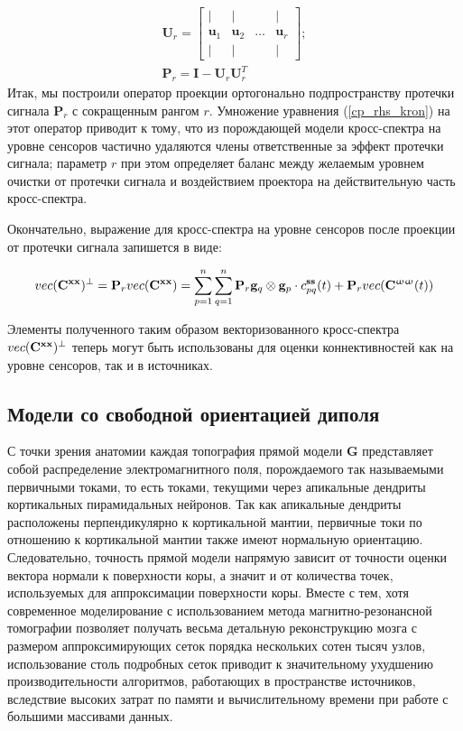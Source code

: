\begin{gather}
    \mathbf{U}_r =
    \begin{bmatrix}
        |            & |            &        & |       \\
        \mathbf{u}_1 & \mathbf{u}_2 & \dots  & \mathbf{u}_r \\
        |            & |            &        & |
    \end{bmatrix}\label{eq:U_fixed_or};\\
    \mathbf{P}_r = \mathbf{I} - \mathbf{U}_r \mathbf{U}_r^T\label{eq:P_fixed_or}
 \end{gather}
Итак, мы построили оператор проекции ортогонально подпространству протечки сигнала $\mathbf{P}_r$
с сокращенным рангом $r$.
Умножение уравнения (\ref{cp_rhs_kron}) на этот оператор приводит к тому, что  из порождающей
модели кросс-спектра на уровне сенсоров частично удаляются члены ответственные за эффект протечки сигнала;
параметр $r$ при этом определяет баланс между желаемым уровнем очистки от протечки сигнала и
воздействием проектора на действительную часть кросс-спектра.

Окончательно, выражение для кросс-спектра на уровне сенсоров после проекции от протечки сигнала
запишется в виде:

\begin{equation}
    vec(\mathbf{C}^{\mathbf{x x}})^\perp = \mathbf{P}_r vec(\mathbf{C}^{\mathbf{x x}}) =
    \sum\limits_{p=1}^n\sum\limits_{q=1}^n \mathbf{P}_r \mathbf{g}_q\otimes
    \mathbf{g}_p \cdot c_{pq}^{\mathbf{ss}}(t) + \mathbf{P}_r vec(\mathbf{C}^{\mathbf{\upomega \upomega}}(t))
    \label{eq:cp_final}
\end{equation}

Элементы полученного таким образом векторизованного кросс-спектра $vec(\mathbf{C}^{\mathbf{x x}})^\perp$ теперь могут быть
использованы для оценки коннективностей как на уровне сенсоров, так и в источниках.

\subsection{Модели со свободной ориентацией диполя}
С точки зрения анатомии каждая топография прямой модели $\mathbf{G}$
представляет собой распределение электромагнитного поля,
порождаемого так называемыми первичными токами, то есть токами,
текущими через апикальные дендриты кортикальных пирамидальных нейронов.
Так как апикальные дендриты расположены перпендикулярно к кортикальной мантии,
первичные токи по отношению к кортикальной мантии также имеют нормальную ориентацию.
Следовательно, точность прямой модели напрямую зависит от точности оценки вектора нормали
к поверхности коры, а значит и от количества точек, используемых для аппроксимации поверхности коры.
Вместе с тем, хотя современное моделирование с использованием метода магнитно-резонансной
томографии позволяет получать весьма детальную реконструкцию мозга с размером аппроксимирующих сеток
порядка нескольких сотен тысяч узлов, использование столь подробных сеток приводит к значительному
ухудшению производительности алгоритмов, работающих в пространстве источников, вследствие высоких затрат
по памяти и вычислительному времени при работе с большими массивами данных.

